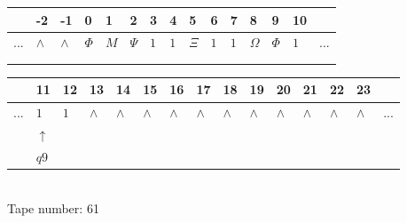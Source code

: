 \documentclass[11pt]{article}
\begin{document}
\begin{table}[H]
\centering
\begin{tabular}{lllllllllllllll}
 & -2 & -1 & 0 & 1 & 2 & 3 & 4 & 5 & 6 & 7 & 8 & 9 & 10 & \\
\hline
$...$ & \multicolumn{1}{|l|}{$\wedge$} & \multicolumn{1}{|l|}{$\wedge$} & \multicolumn{1}{|l|}{$\Phi$} & \multicolumn{1}{|l|}{$M$} & \multicolumn{1}{|l|}{$\Psi$} & \multicolumn{1}{|l|}{$1$} & \multicolumn{1}{|l|}{$1$} & \multicolumn{1}{|l|}{$\Xi$} & \multicolumn{1}{|l|}{$1$} & \multicolumn{1}{|l|}{$1$} & \multicolumn{1}{|l|}{$\Omega$} & \multicolumn{1}{|l|}{$\Phi$} & \multicolumn{1}{|l|}{$1$} & $...$\\
\hline
&  &  &  &  &  &  &  &  &  &  &  &  &  &  \\
&  &  &  &  &  &  &  &  &  &  &  &  &  &  \\
\end{tabular}
\begin{tabular}{lllllllllllllll}
 & 11 & 12 & 13 & 14 & 15 & 16 & 17 & 18 & 19 & 20 & 21 & 22 & 23 & \\
\hline
$...$ & \multicolumn{1}{|l|}{$1$} & \multicolumn{1}{|l|}{$1$} & \multicolumn{1}{|l|}{$\wedge$} & \multicolumn{1}{|l|}{$\wedge$} & \multicolumn{1}{|l|}{$\wedge$} & \multicolumn{1}{|l|}{$\wedge$} & \multicolumn{1}{|l|}{$\wedge$} & \multicolumn{1}{|l|}{$\wedge$} & \multicolumn{1}{|l|}{$\wedge$} & \multicolumn{1}{|l|}{$\wedge$} & \multicolumn{1}{|l|}{$\wedge$} & \multicolumn{1}{|l|}{$\wedge$} & \multicolumn{1}{|l|}{$\wedge$} & $...$\\
\hline
& $\uparrow$ &  &  &  &  &  &  &  &  &  &  &  &  &  \\
& $ q9 $ &  &  &  &  &  &  &  &  &  &  &  &  &  \\
\end{tabular}
\\
Tape number: 61
\noindent\makebox[\linewidth]{\hdashrule{\textwidth}{1pt}{1pt}}\end{table}
\end{document}
